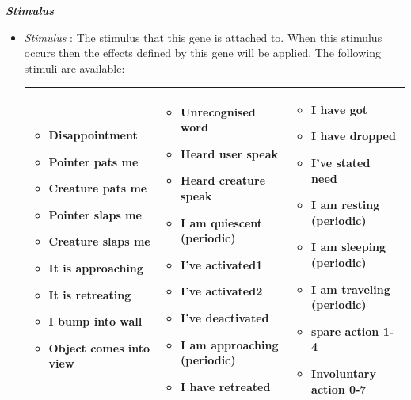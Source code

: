 \documentclass[11pt,twoside,a4paper]{article}
\begin{document}
\textbf{\textit{Stimulus}}
\begin{itemize}
\item[] \emph{Stimulus} : The stimulus that this gene is attached to. When this stimulus occurs then the effects defined by this gene will be applied. The following stimuli are available:
	\begin{center} \begin{scriptsize}
		\begin{tabular}{|p{}|p{}|p{}|}
			\hline
			\begin{itemize}
				\item Disappointment
				\item Pointer pats me
				\item Creature pats me
				\item Pointer slaps me
				\item Creature slaps me
				\item It is approaching
				\item It is retreating
				\item I bump into wall
				\item Object comes into view
			\end{itemize}
			&
			\begin{itemize}
				\item Unrecognised word
				\item Heard user speak
				\item Heard creature speak
				\item I am quiescent (periodic)
				\item I've activated1
				\item I've activated2
				\item I've deactivated
				\item I am approaching (periodic)
				\item I have retreated
			\end{itemize}
			&
			\begin{itemize}
				\item I have got
				\item I have dropped
				\item I've stated need
				\item I am resting (periodic)
				\item I am sleeping (periodic)
				\item I am traveling (periodic)
				\item spare action 1-4
				\item Involuntary action 0-7
			\end{itemize} \\ \hline
		\end{tabular}
	\end{scriptsize} \end{center}~\\
 

\end{itemize}
\end{document}
